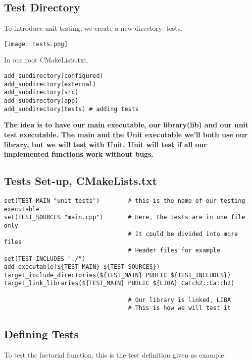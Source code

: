 \subsection{Test Directory}

To introduce unit testing, we create a new directory: tests.

\begin{center}
    \texttt{[image: tests.png]}
\end{center}

In our root CMakeLists.txt.  

\begin{verbatim}
add_subdirectory(configured)
add_subdirectory(external)
add_subdirectory(src)
add_subdirectory(app)
add_subdirectory(tests) # adding tests
\end{verbatim}

\textbf{The idea is to have our main executable, our library(lib) and our unit test executable. The main and the Unit
executable we'll both use our library, but we will test with Unit. Unit will test if all our implemented functions work without bugs.}


\subsection{Tests Set-up, CMakeLists.txt}

\begin{verbatim}
set(TEST_MAIN "unit_tests")        # this is the name of our testing executable
set(TEST_SOURCES "main.cpp")       # Here, the tests are in one file only
                                   # It could be divided into more files
                                   # Header files for example
set(TEST_INCLUDES "./")
add_executable(${TEST_MAIN} ${TEST_SOURCES})
target_include_directories(${TEST_MAIN} PUBLIC ${TEST_INCLUDES})
target_link_libraries(${TEST_MAIN} PUBLIC ${LIBA} Catch2::Catch2)

                                   # Our library is linked, LIBA
                                   # This is how we will test it
\end{verbatim}


\subsection{Defining Tests}

To test the factorial function, this is the test definition given as example.

